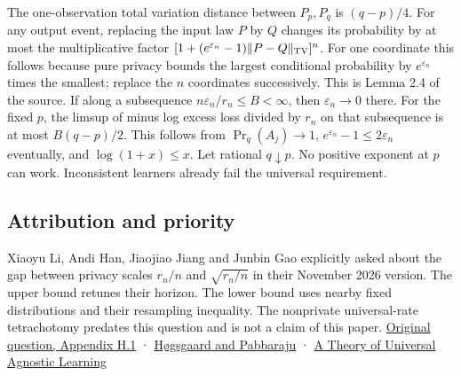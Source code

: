 \documentclass[11pt]{article}
\begin{document}
The one-observation total variation distance between \(P_p,P_q\) is \((q-p)/4\). For any output event, replacing the input law \(P\) by \(Q\) changes its probability by at most the multiplicative factor \([1+(e^{\varepsilon_n}-1)\|P-Q\|_{\rm TV}]^n\). For one coordinate this follows because pure privacy bounds the largest conditional probability by \(e^{\varepsilon_n}\) times the smallest; replace the \(n\) coordinates successively. This is Lemma 2.4 of the source. If along a subsequence \(n\varepsilon_n/r_n\le B<\infty\), then \(\varepsilon_n\to0\) there. For the fixed \(p\), the limsup of minus log excess loss divided by \(r_n\) on that subsequence is at most \(B(q-p)/2\). This follows from \(\Pr_q(A_j)\to1\), \(e^{\varepsilon_n}-1\le2\varepsilon_n\) eventually, and \(\log(1+x)\le x\). Let rational \(q\downarrow p\). No positive exponent at \(p\) can work. Inconsistent learners already fail the universal requirement.

\subsection{Attribution and priority}\label{attribution-and-priority}

Xiaoyu Li, Andi Han, Jiaojiao Jiang and Junbin Gao explicitly asked about the gap between privacy scales \(r_n/n\) and \(\sqrt{r_n/n}\) in their November 2026 version. The upper bound retunes their horizon. The lower bound uses nearby fixed distributions and their resampling inequality. The nonprivate universal-rate tetrachotomy predates this question and is not a claim of this paper. \href{https://arxiv.org/abs/2604.07238v2}{Original question, Appendix H.1} · \href{https://arxiv.org/abs/2601.23258}{Høgsgaard and Pabbaraju} · \href{https://arxiv.org/abs/2601.20961}{A Theory of Universal Agnostic Learning}
\end{document}
